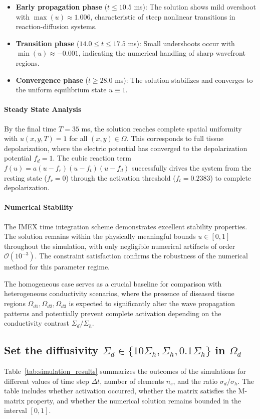 \documentclass[12pt,a4paper]{article}
\begin{document}
\begin{itemize}
    \item \textbf{Early propagation phase} ($t \leq 10.5$ ms): The solution shows mild overshoot with $\max(u) \approx 1.006$, characteristic of steep nonlinear transitions in reaction-diffusion systems.
    
    \item \textbf{Transition phase} ($14.0 \leq t \leq 17.5$ ms): Small undershoots occur with $\min(u) \approx -0.001$, indicating the numerical handling of sharp wavefront regions.
    
    \item \textbf{Convergence phase} ($t \geq 28.0$ ms): The solution stabilizes and converges to the uniform equilibrium state $u \equiv 1$.
\end{itemize}

\paragraph{Steady State Analysis}
By the final time $T = 35$ ms, the solution reaches complete spatial uniformity with $u(x,y,T) = 1$ for all $(x,y) \in \Omega$. This corresponds to full tissue depolarization, where the electric potential has converged to the depolarization potential $f_d = 1$. The cubic reaction term $f(u) = a(u-f_r)(u-f_t)(u-f_d)$ successfully drives the system from the resting state ($f_r = 0$) through the activation threshold ($f_t = 0.2383$) to complete depolarization.

\paragraph{Numerical Stability}
The IMEX time integration scheme demonstrates excellent stability properties. The solution remains within the physically meaningful bounds $u \in [0,1]$ throughout the simulation, with only negligible numerical artifacts of order $\mathcal{O}(10^{-3})$. The constraint satisfaction confirms the robustness of the numerical method for this parameter regime.

The homogeneous case serves as a crucial baseline for comparison with heterogeneous conductivity scenarios, where the presence of diseased tissue regions $\Omega_{d1}, \Omega_{d2}, \Omega_{d3}$ is expected to significantly alter the wave propagation patterns and potentially prevent complete activation depending on the conductivity contrast $\Sigma_d/\Sigma_h$.

\subsection{Set the diffusivity $\Sigma_d \in \{10\Sigma_h, \Sigma_h, 0.1\Sigma_h\}$ in $\Omega_d$}
Table~\ref{tab:simulation_results} summarizes the outcomes of the simulations for different values of time step $\Delta t$, number of elements $n_e$, and the ratio $\sigma_d / \sigma_h$. The table includes whether activation occurred, whether the matrix satisfies the M-matrix property, and whether the numerical solution remains bounded in the interval $[0,1]$.
\end{document}
